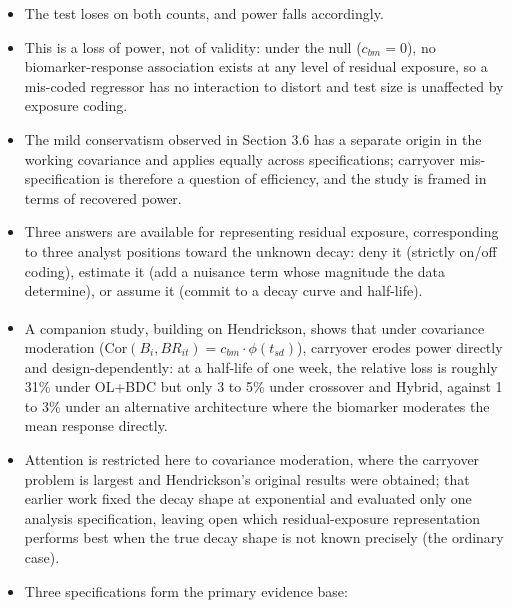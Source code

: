 \documentclass[
  11pt,
]{article}
\newcounter{none} %
\providecommand{\tightlist}{%
  \setlength{\itemsep}{0pt}\setlength{\parskip}{0pt}}
\begin{document}
\begin{itemize}
  \begin{itemize}
  \tightlist
  \item
    The interaction contrast is diluted, since occasions still
    carrying substantial drug effect are coded identically to
    occasions carrying none, biasing the biomarker-by-exposure
    coefficient toward zero (as any error-prone covariate would).
  \item
    Those same occasions are heterogeneous in a way the model does
    not represent, so unexplained variation inflates the standard
    error of the already-attenuated coefficient.
  \end{itemize}
\item
  The test loses on both counts, and power falls accordingly.
\item
  This is a loss of power, not of validity: under the null
  (\(c_{bm}=0\)), no biomarker-response association exists at any level
  of residual exposure, so a mis-coded regressor has no interaction to
  distort and test size is unaffected by exposure coding.
\item
  The mild conservatism observed in Section 3.6 has a separate origin
  in the working covariance and applies equally across
  specifications; carryover mis-specification is therefore a question
  of efficiency, and the study is framed in terms of recovered power.
\item
  Three answers are available for representing residual exposure,
  corresponding to three analyst positions toward the unknown decay:
  deny it (strictly on/off coding), estimate it (add a nuisance term
  whose magnitude the data determine), or assume it (commit to a
  decay curve and half-life).
\item
  A companion study\textsuperscript{}, building on
  Hendrickson\textsuperscript{}, shows that under covariance
  moderation (\(\text{Cor}(B_i, BR_{it}) = c_{bm} \cdot \phi(t_{sd})\)),
  carryover erodes power directly and design-dependently: at a
  half-life of one week, the relative loss is roughly 31\% under
  OL+BDC but only 3 to 5\% under crossover and Hybrid, against 1 to 3\%
  under an alternative architecture where the biomarker moderates the
  mean response directly.
\item
  Attention is restricted here to covariance moderation, where the
  carryover problem is largest and Hendrickson's original results
  were obtained; that earlier work fixed the decay shape at
  exponential and evaluated only one analysis specification, leaving
  open which residual-exposure representation performs best when the
  true decay shape is not known precisely (the ordinary case).
\item
  Three specifications form the primary evidence base:


\end{itemize}
\end{document}
